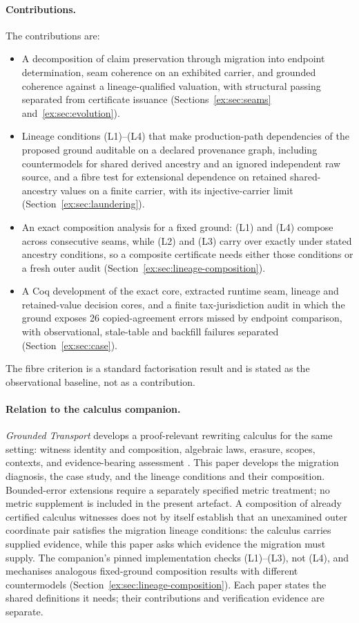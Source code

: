 \documentclass[11pt]{article}
\theoremstyle{definition}
\begin{document}
\paragraph{Contributions.} The contributions are:
\begin{itemize}
\item A decomposition of claim preservation through migration into endpoint determination, seam coherence on an exhibited carrier, and grounded coherence against a lineage-qualified valuation, with structural passing separated from certificate issuance (Sections~\ref{ex:sec:seams} and~\ref{ex:sec:evolution}).
\item Lineage conditions (L1)--(L4) that make production-path dependencies of the proposed ground auditable on a declared provenance graph, including countermodels for shared derived ancestry and an ignored independent raw source, and a fibre test for extensional dependence on retained shared-ancestry values on a finite carrier, with its injective-carrier limit (Section~\ref{ex:sec:laundering}).
\item An exact composition analysis for a fixed ground: (L1) and (L4) compose across consecutive seams, while (L2) and (L3) carry over exactly under stated ancestry conditions, so a composite certificate needs either those conditions or a fresh outer audit (Section~\ref{ex:sec:lineage-composition}).
\item A Coq development of the exact core, extracted runtime seam, lineage and retained-value decision cores, and a finite tax-jurisdiction audit in which the ground exposes 26 copied-agreement errors missed by endpoint comparison, with observational, stale-table and backfill failures separated (Section~\ref{ex:sec:case}).
\end{itemize}
The fibre criterion is a standard factorisation result and is stated as the observational baseline, not as a contribution.

\paragraph{Relation to the calculus companion.} \emph{Grounded Transport} develops a proof-relevant rewriting calculus for the same setting: witness identity and composition, algebraic laws, erasure, scopes, contexts, and evidence-bearing assessment \citep{moore2026transport}. This paper develops the migration diagnosis, the case study, and the lineage conditions and their composition. Bounded-error extensions require a separately specified metric treatment; no metric supplement is included in the present artefact. A composition of already certified calculus witnesses does not by itself establish that an unexamined outer coordinate pair satisfies the migration lineage conditions: the calculus carries supplied evidence, while this paper asks which evidence the migration must supply. The companion's pinned implementation checks (L1)--(L3), not (L4), and mechanises analogous fixed-ground composition results with different countermodels (Section~\ref{ex:sec:lineage-composition}). Each paper states the shared definitions it needs; their contributions and verification evidence are separate.
\end{document}
